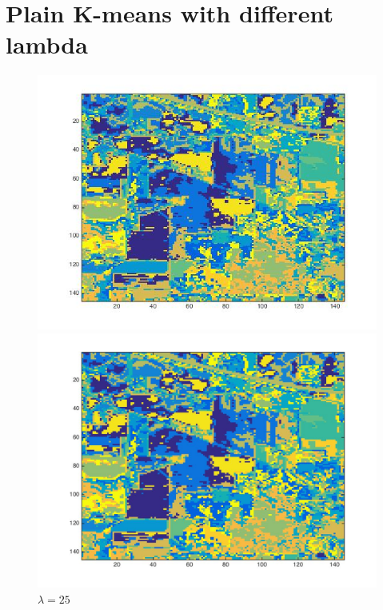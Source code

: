 \documentclass[11pt]{article}
\begin{document}
\section*{Plain K-means with different lambda}

\begin{figure}[h!]
\begin{minipage}{.5\textwidth}
  \includegraphics[scale=0.45]{plain_km_lambda10.jpg}
  \caption{$\lambda = 10$}
  \label{fig:3}
\end{minipage}%
\begin{minipage}{.5\textwidth}
  \includegraphics[scale=0.21]{plain_km_lambda25.jpg}
  \caption{$\lambda = 25$}
  \label{fig:3}
\end{minipage}
\end{figure}
\end{document}
